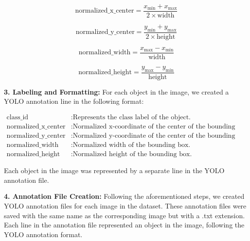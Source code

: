    \begin{equation}
    \text{normalized\_x\_center} = \frac{x_{\text{min}} + x_{\text{max}}}{2 \times \text{width}}
    \end{equation}
    
    \begin{equation}
    \text{normalized\_y\_center} = \frac{y_{\text{min}} + y_{\text{max}}}{2 \times \text{height}}
    \end{equation}
    
    \begin{equation}
    \text{normalized\_width} = \frac{x_{\text{max}} - x_{\text{min}}}{\text{width}}
    \end{equation}
    
    \begin{equation}
    \text{normalized\_height} = \frac{y_{\text{max}} - y_{\text{min}}}{\text{height}}
   \end{equation}


\textbf{3. Labeling and Formatting:} For each object in the image, we created a YOLO annotation line in the following format: \\

 \quad {} \quad {} \quad {} \quad {}

   \begin{align*}
    \text{class\_id} & : \text{Represents the class label of the object.} \\
    \text{normalized\_x\_center} & : \text{Normalized x-coordinate of the center of the bounding box.} \\
    \text{normalized\_y\_center} & : \text{Normalized y-coordinate of the center of the bounding box.} \\
    \text{normalized\_width} & : \text{Normalized width of the bounding box.} \\
    \text{normalized\_height} & : \text{Normalized height of the bounding box.} 
    \end{align*}

   Each object in the image was represented by a separate line in the YOLO annotation file.

\textbf{4. Annotation File Creation:} Following the aforementioned steps, we created YOLO annotation files for each image in the dataset. These annotation files were saved with the same name as the corresponding image but with a .txt extension. Each line in the annotation file represented an object in the image, following the YOLO annotation format.

